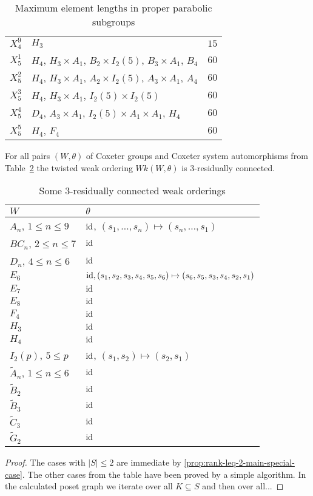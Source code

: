 \begin{table}[ht]
\begin{tabular}{l|p{7cm}|l}
		$X_4^9$ & $H_3$ & $15$ \\
		$X_5^1$ & $H_4$, $H_3 \times A_1$, $B_2 \times I_2(5)$, $B_3 \times A_1$, $B_4$ & $60$ \\
		$X_5^2$ & $H_4$, $H_3 \times A_1$, $A_2 \times I_2(5)$, $A_3 \times A_1$, $A_4$ & $60$ \\
		$X_5^3$ & $H_4$, $H_3 \times A_1$, $I_2(5) \times I_2(5)$ & $60$ \\
		$X_5^4$ & $D_4$, $A_3 \times A_1$, $I_2(5) \times A_1 \times A_1$, $H_4$ & $60$ \\
		$X_5^5$ & $H_4$, $F_4$ & $60$ \\
	\end{tabular}
	\caption{Maximum element lengths in proper parabolic subgroups}
	\label{tab:parabolic-max-length}	
\end{table}

\begin{theo}
	For all pairs $(W,\theta)$ of Coxeter groups and Coxeter system automorphisms from Table~\ref{tab:rc3-wks} the twisted weak ordering $Wk(W,\theta)$ is 3-residually connected.

	\begin{table}[ht]
		\centering
		\begin{tabular}{ll}
			$W$ & $\theta$ \\
			\hline
			$A_n$, $1 \leq n \leq 9$ & $\operatorname{id}$, $(s_1, \ldots, s_n) \mapsto (s_n, \ldots, s_1)$ \\
			$BC_{n}$, $2 \leq n \leq 7$ & $\operatorname{id}$ \\
			$D_{n}$, $4 \leq n \leq 6$ & $\operatorname{id}$ \\
			$E_6$ & $\operatorname{id}, (s_1,s_2,s_3,s_4,s_5,s_6) \mapsto (s_6,s_5,s_3,s_4,s_2,s_1)$ \\
			$E_7$ & $\operatorname{id}$ \\
			$E_8$ & $\operatorname{id}$ \\
			$F_4$ & $\operatorname{id}$ \\
			$H_3$ & $\operatorname{id}$ \\
			$H_4$ & $\operatorname{id}$ \\
			$I_2(p)$, $5 \leq p$ & $\operatorname{id}$, $(s_1,s_2) \mapsto (s_2,s_1)$ \\
			$\tilde A_{n}$, $1 \leq n \leq 6$ & $\operatorname{id}$ \\
			$\tilde B_{2}$ & $\operatorname{id}$ \\
			$\tilde B_{3}$ & $\operatorname{id}$ \\
			$\tilde C_{3}$ & $\operatorname{id}$ \\
			$\tilde G_2$ & $\operatorname{id}$ \\
		\end{tabular}
		\caption{Some 3-residually connected weak orderings}
		\label{tab:rc3-wks}	
	\end{table}

	\begin{proof}
		The cases with $|S| \leq 2$ are immediate by \ref{prop:rank-leq-2-main-special-case}. The other cases from the table have been proved by a simple algorithm. In the calculated poset graph we iterate over all $K \subseteq S$ and then over all... \todo
	\end{proof}
\end{theo}
